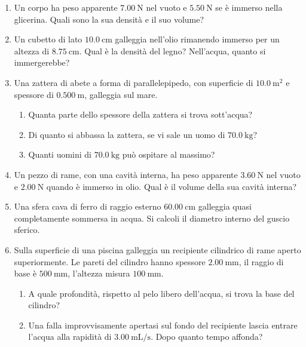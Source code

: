 \begin{enumerate}

    \item Un corpo ha peso apparente $\SI{7,00}{\newton}$ nel vuoto e $\SI{5,50}{\newton}$ se è immerso nella glicerina. Quali sono la sua densità e il suo volume?
    
    \item Un cubetto di lato  $\SI{10,0}{\cm}$ galleggia nell'olio rimanendo immerso per un altezza di $\SI{8,75}{\cm}$. Qual è la densità del legno? Nell'acqua, quanto si immergerebbe?

    \item Una zattera di abete a forma di parallelepipedo, con superficie di $\SI{10,0}{\meter^2}$ e spessore di $\SI{0,500}{\m}$, galleggia sul mare. 
    \begin{enumerate}
        \item Quanta parte dello spessore della zattera si trova sott'acqua?
        \item Di quanto si abbassa la zattera, se vi sale un uomo di $\SI{70,0}{\kg}$?
        \item Quanti uomini di $\SI{70,0}{\kg}$ può ospitare al massimo?
    \end{enumerate}
    
    \item Un pezzo di rame, con una cavità interna, ha peso apparente $\SI{3,60}{\newton}$ nel vuoto e $\SI{2,00}{\newton}$ quando è immerso in olio. Qual è il volume della sua cavità interna?

    \item Una sfera cava di ferro di raggio esterno $\SI{60,00}{\cm}$ galleggia quasi completamente sommersa in acqua. Si calcoli il diametro interno del guscio sferico.

    \item Sulla superficie di una piscina galleggia un recipiente cilindrico di rame aperto superiormente. Le pareti del cilindro hanno spessore $\SI{2,00}{\mm}$, il raggio di base è $\SI{500}{\mm}$, l'altezza misura  $\SI{100}{\mm}$.
    \begin{enumerate}
        \item A quale profondità, rispetto al pelo libero dell'acqua, si trova la base del cilindro?
        \item Una falla improvvisamente apertasi sul fondo del recipiente lascia entrare l'acqua alla rapidità di $\SI{3,00}{\milli\liter/\second}$. Dopo quanto tempo affonda?
    \end{enumerate}
    

\end{enumerate}
